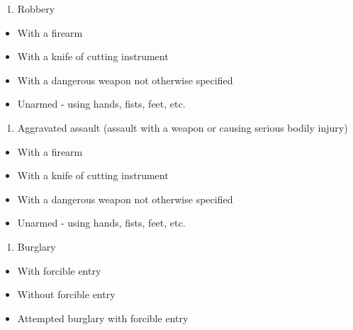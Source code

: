 \documentclass[
  12pt,
  openany]{book}
\providecommand{\tightlist}{%
  \setlength{\itemsep}{0pt}\setlength{\parskip}{0pt}}
\begin{document}
\begin{enumerate}
\def\labelenumi{\arabic{enumi}.}
\setcounter{enumi}{2}
\tightlist
\item
  Robbery\\
\end{enumerate}

\begin{itemize}
\tightlist
\item
  With a firearm\\
\item
  With a knife of cutting instrument\\
\item
  With a dangerous weapon not otherwise specified\\
\item
  Unarmed - using hands, fists, feet, etc.\\
\end{itemize}

\begin{enumerate}
\def\labelenumi{\arabic{enumi}.}
\setcounter{enumi}{3}
\tightlist
\item
  Aggravated assault (assault with a weapon or causing serious bodily injury)\\
\end{enumerate}

\begin{itemize}
\tightlist
\item
  With a firearm\\
\item
  With a knife of cutting instrument\\
\item
  With a dangerous weapon not otherwise specified\\
\item
  Unarmed - using hands, fists, feet, etc.\\
\end{itemize}

\begin{enumerate}
\def\labelenumi{\arabic{enumi}.}
\setcounter{enumi}{4}
\tightlist
\item
  Burglary\\
\end{enumerate}

\begin{itemize}
\tightlist
\item
  With forcible entry\\
\item
  Without forcible entry\\
\item
  Attempted burglary with forcible entry\\
\end{itemize}
\end{document}
